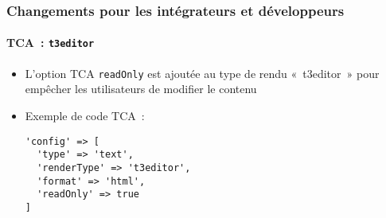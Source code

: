 %

\begin{frame}[fragile]
	\frametitle{Changements pour les intégrateurs et développeurs}
	\framesubtitle{TCA~: \texttt{t3editor}}


	\begin{itemize}
		\item L'option TCA \texttt{readOnly} est ajoutée au type de rendu «~t3editor~»
			pour empêcher les utilisateurs de modifier le contenu
		\item Exemple de code TCA~:
\begin{lstlisting}
'config' => [
  'type' => 'text',
  'renderType' => 't3editor',
  'format' => 'html',
  'readOnly' => true
]
\end{lstlisting}

	\end{itemize}

\end{frame}

